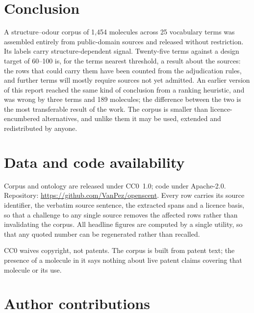 \documentclass[
  computerscience
]{genesisl1-paper}
\begin{document}
\section{Conclusion}

A structure--odour corpus of 1{,}454 molecules across 25 vocabulary terms was assembled
entirely from public-domain sources and released without restriction. Its labels carry
structure-dependent signal. Twenty-five terms against a design target of 60--100 is, for
the terms nearest threshold, a result about the sources: the rows that could carry them
have been counted from the adjudication rules, and further terms will mostly require
sources not yet admitted. An earlier version of this report reached the same kind of
conclusion from a ranking heuristic, and was wrong by three terms and 189 molecules; the
difference between the two is the most transferable result of the work. The corpus is
smaller than licence-encumbered alternatives, and unlike them it may be used, extended
and redistributed by anyone.

\section*{Data and code availability}

Corpus and ontology are released under CC0~1.0; code under Apache-2.0. Repository:
\url{https://github.com/VanPez/openscent}. Every row carries its source identifier, the
verbatim source sentence, the extracted spans and a licence basis, so that a challenge to
any single source removes the affected rows rather than invalidating the corpus. All
headline figures are computed by a single utility, so that any quoted number can be
regenerated rather than recalled.

CC0 waives copyright, not patents. The corpus is built from patent text; the presence of
a molecule in it says nothing about live patent claims covering that molecule or its use.


\section*{Author contributions}
\end{document}
